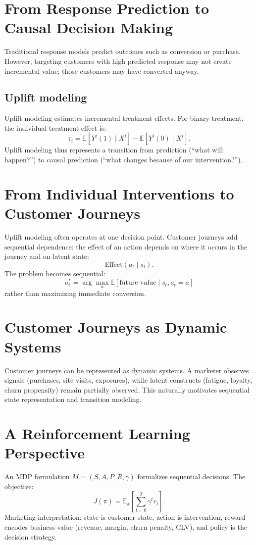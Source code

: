 \documentclass[11pt]{article}
\newcommand{\E}{\mathbb{E}}
\newcommand{\st}{s_t}
\newcommand{\at}{a_t}
\begin{document}
\section{From Response Prediction to Causal Decision Making}
Traditional response models predict outcomes such as conversion or purchase. However, targeting customers with high predicted response may not create incremental value; those customers may have converted anyway.

\subsection{Uplift modeling}
Uplift modeling estimates incremental treatment effects. For binary treatment, the individual treatment effect is:
\[
\tau_i=\E[Y^i(1)\mid X^i]-\E[Y^i(0)\mid X^i].
\]
Uplift modeling thus represents a transition from prediction (``what will happen?'') to causal prediction (``what changes because of our intervention?'').

\section{From Individual Interventions to Customer Journeys}
Uplift modeling often operates at one decision point. Customer journeys add sequential dependence: the effect of an action depends on where it occurs in the journey and on latent state:
\[
\mathrm{Effect}(\at \mid \st).
\]
The problem becomes sequential:
\[
a_t^\ast = \arg\max_{a}\E[\text{future value}\mid \st, \at=a]
\]
rather than maximizing immediate conversion.

\section{Customer Journeys as Dynamic Systems}
Customer journeys can be represented as dynamic systems. A marketer observes signals (purchases, site visits, exposures), while latent constructs (fatigue, loyalty, churn propensity) remain partially observed. This naturally motivates sequential state representation and transition modeling.

\section{A Reinforcement Learning Perspective}
An MDP formulation $M=(S,A,P,R,\gamma)$ formalizes sequential decisions. The objective:
\[
J(\pi)=\E_{\pi}\left[\sum_{t=0}^{T}\gamma^t r_t\right].
\]
Marketing interpretation: state is customer state, action is intervention, reward encodes business value (revenue, margin, churn penalty, CLV), and policy is the decision strategy.
\end{document}
